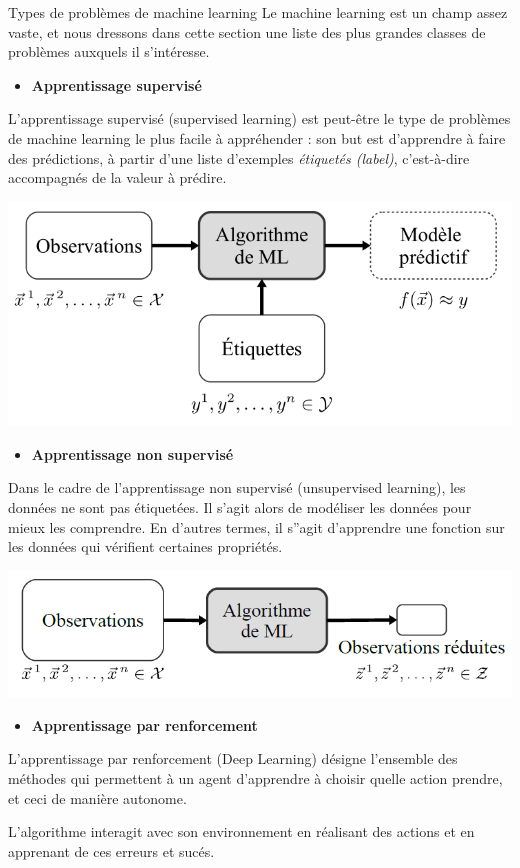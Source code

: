 \documentclass[
  10pt,
  ignorenonframetext,
]{beamer}
\providecommand{\tightlist}{%
  \setlength{\itemsep}{0pt}\setlength{\parskip}{0pt}}
\begin{document}
\begin{frame}{Types de problèmes de machine learning}
Le machine learning est un champ assez vaste, et nous dressons dans
cette section une liste des plus grandes classes de problèmes auxquels
il s'intéresse.

\begin{itemize}
\tightlist
\item
  \textbf{Apprentissage supervisé}
\end{itemize}

L'apprentissage supervisé (supervised learning) est peut-être le type de
problèmes de machine learning le plus facile à appréhender : son but est
d'apprendre à faire des prédictions, à partir d'une liste d'exemples
\emph{étiquetés (label)}, c'est-à-dire accompagnés de la valeur à
prédire.

\includegraphics{fig/fig1.png}
\end{frame}

\begin{frame}
\begin{itemize}
\tightlist
\item
  \textbf{Apprentissage non supervisé}
\end{itemize}

Dans le cadre de l'apprentissage non supervisé (unsupervised learning),
les données ne sont pas étiquetées. Il s'agit alors de modéliser les
données pour mieux les comprendre. En d'autres termes, il s''agit
d'apprendre une fonction sur les données qui vérifient certaines
propriétés.

\includegraphics{fig/fig2.png}
\end{frame}

\begin{frame}
\begin{itemize}
\tightlist
\item
  \textbf{Apprentissage par renforcement}
\end{itemize}

L'apprentissage par renforcement (Deep Learning) désigne l'ensemble des
méthodes qui permettent à un agent d'apprendre à choisir quelle action
prendre, et ceci de manière autonome.

L'algorithme interagit avec son environnement en réalisant des actions
et en apprenant de ces erreurs et sucés.
\end{frame}
\end{document}
